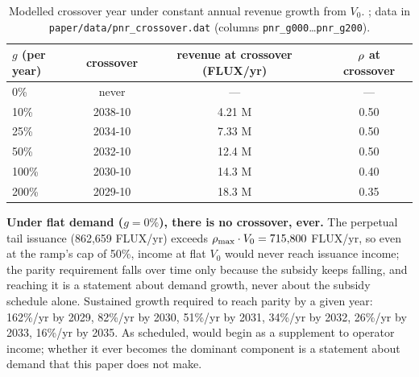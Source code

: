\begin{table}[H]
\centering
\small
\begin{tabular}{lccc}
\toprule
$g$ (per year) & crossover & revenue at crossover (FLUX/yr) & $\rho$ at crossover \\
\midrule
0\% & never & --- & --- \\
10\% & 2038-10 & 4.21 M & 0.50 \\
25\% & 2034-10 & 7.33 M & 0.50 \\
50\% & 2032-10 & 12.4 M & 0.50 \\
100\% & 2030-10 & 14.3 M & 0.40 \\
200\% & 2029-10 & 18.3 M & 0.35 \\
\bottomrule
\end{tabular}
\caption{Modelled crossover year under constant annual revenue growth from $V_0$.
; data in \texttt{paper/\allowbreak{}data/\allowbreak{}pnr\_crossover.\allowbreak{}dat}
(columns \texttt{pnr\_g000}\ldots\texttt{pnr\_g200}).}
\label{tab:eval-pnr-growth}
\end{table}

\textbf{Under flat demand ($g = 0\%$), there is no crossover, ever.} The perpetual tail issuance
(862,659 FLUX/yr) exceeds $\rho_{\max} \cdot V_0 = 715{,}800$ FLUX/yr, so even at the ramp's cap
of 50\%, \PNR income at flat $V_0$ would never reach \PoN issuance income; the parity requirement
falls over time only because the subsidy keeps falling, and reaching it is a statement about demand
growth, never about the subsidy schedule alone. Sustained growth required to reach parity by a
given year: 162\%/yr by 2029, 82\%/yr by 2030, 51\%/yr by 2031, 34\%/yr by 2032, 26\%/yr by 2033,
16\%/yr by 2035. As scheduled, \PNR would begin as a supplement to operator income; whether it ever
becomes the dominant component is a statement about demand that this paper does not make.

